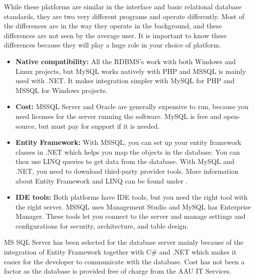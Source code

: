 While these platforms are similar in the interface and basic relational database standards, they are two very different programs and operate differently. Most of the differences are in the way they operate in the background, and these differences are not seen by the average user. It is important to know these differences because they will play a huge role in your choice of platform.

\begin{itemize}
    \item \textbf{Native compatibility:} All the RDBMS's work with both Windows and Linux projects, but MySQL works natively with PHP and MSSQL is mainly used with .NET. It makes integration simpler with MySQL for PHP and MSSQL for Windows projects. 
    \item \textbf{Cost:} MSSQL Server and Oracle are generally expensive to run, because you need licenses for the server running the software. MySQL is free and open-source, but must pay for support if it is needed.
    
    \item \textbf{Entity Framework:} With MSSQL, you can set up your entity framework classes in .NET which helps you map the objects in the database. You can then use LINQ queries to get data from the database. With MySQL and .NET, you need to download third-party provider tools. More information about Entity Framework and LINQ can be found under .
    
    \item \textbf{IDE tools:} Both platforms have IDE tools, but you need the right tool with the right server. MSSQL uses Management Studio and MySQL has Enterprise Manager. These tools let you connect to the server and manage settings and configurations for security, architecture, and table design.
\end{itemize}

\noindent
MS SQL Server has been selected for the database server mainly because of the integration of Entity Framework together with C\# and .NET which makes it easier for the developer to communicate with the database.
Cost has not been a factor as the database is provided free of charge from the AAU IT Services.